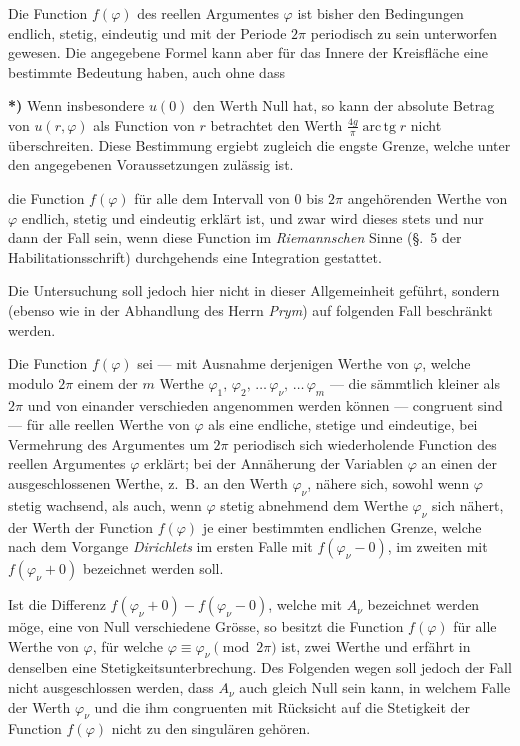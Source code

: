 \documentclass{article}
\begin{document}
Die Function $f(\varphi)$ des reellen Argumentes $\varphi$ ist bisher den Bedingungen endlich, stetig, eindeutig und mit der Periode $2\pi$ periodisch zu sein unterworfen gewesen. Die angegebene Formel kann aber für das Innere der Kreisfläche eine bestimmte Bedeutung haben, auch ohne dass

\textbf{*)} Wenn insbesondere $u(0)$ den Werth Null hat, so kann der absolute Betrag von $u(r, \varphi)$ als Function von $r$ betrachtet den Werth $\frac{4g}{\pi} \operatorname{arc\,tg} r$ nicht überschreiten. Diese Bestimmung ergiebt zugleich die engste Grenze, welche unter den angegebenen Voraussetzungen zulässig ist.

die Function $f(\varphi)$ für alle dem Intervall von $0$ bis $2\pi$ angehörenden Werthe von $\varphi$ endlich, stetig und eindeutig erklärt ist, und zwar wird dieses stets und nur dann der Fall sein, wenn diese Function im \emph{Riemannschen} Sinne (§.~5 der Habilitationsschrift) durchgehends eine Integration gestattet.

Die Untersuchung soll jedoch hier nicht in dieser Allgemeinheit geführt, sondern (ebenso wie in der Abhandlung des Herrn \emph{Prym}) auf folgenden Fall beschränkt werden.

Die Function $f(\varphi)$ sei --- mit Ausnahme derjenigen Werthe von $\varphi$, welche modulo $2\pi$ einem der $m$ Werthe $\varphi_1, \, \varphi_2, \, \dots \, \varphi_\nu, \, \dots \, \varphi_m$ --- die sämmtlich kleiner als $2\pi$ und von einander verschieden angenommen werden können --- congruent sind --- für alle reellen Werthe von $\varphi$ als eine endliche, stetige und eindeutige, bei Vermehrung des Argumentes um $2\pi$ periodisch sich wiederholende Function des reellen Argumentes $\varphi$ erklärt; bei der Annäherung der Variablen $\varphi$ an einen der ausgeschlossenen Werthe, z.~B. an den Werth $\varphi_\nu$, nähere sich, sowohl wenn $\varphi$ stetig wachsend, als auch, wenn $\varphi$ stetig abnehmend dem Werthe $\varphi_\nu$ sich nähert, der Werth der Function $f(\varphi)$ je einer bestimmten endlichen Grenze, welche nach dem Vorgange \emph{Dirichlets} im ersten Falle mit $f(\varphi_\nu - 0)$, im zweiten mit $f(\varphi_\nu + 0)$ bezeichnet werden soll.

Ist die Differenz $f(\varphi_\nu + 0) - f(\varphi_\nu - 0)$, welche mit $A_\nu$ bezeichnet werden möge, eine von Null verschiedene Grösse, so besitzt die Function $f(\varphi)$ für alle Werthe von $\varphi$, für welche $\varphi \equiv \varphi_\nu \pmod{2\pi}$ ist, zwei Werthe und erfährt in denselben eine Stetigkeitsunterbrechung. Des Folgenden wegen soll jedoch der Fall nicht ausgeschlossen werden, dass $A_\nu$ auch gleich Null sein kann, in welchem Falle der Werth $\varphi_\nu$ und die ihm congruenten mit Rücksicht auf die Stetigkeit der Function $f(\varphi)$ nicht zu den singulären gehören.
\end{document}
